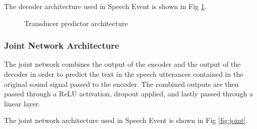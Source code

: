 \documentclass{CSSRforAfrica}
\begin{document}
The decoder architecture used in Speech Event is shown in Fig \ref{fig:transducer-decoder}.

\begin{figure}[thb]
\begin{center}
\end{center}
\caption{Transducer predictor architecture}
\label{fig:transducer-decoder}
\end{figure}

\subsubsection{Joint Network Architecture}
The joint network combines the output of the encoder and the output of the decoder in order to predict the text in the speech utterances contained in the original sound signal passed to the encoder. The combined outputs are then passed through a ReLU activation, dropout applied, and lastly passed through a linear layer.

The joint network architecture used in Speech Event is shown in Fig \ref{fig:joint}.
\end{document}
